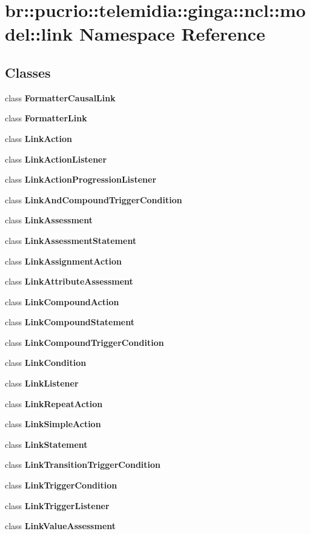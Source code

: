 \section{br::pucrio::telemidia::ginga::ncl::model::link Namespace Reference}
\label{namespacebr_1_1pucrio_1_1telemidia_1_1ginga_1_1ncl_1_1model_1_1link}


\subsection*{Classes}
\begin{CompactItemize}
\item 
class {\bf FormatterCausalLink}
\item 
class {\bf FormatterLink}
\item 
class {\bf LinkAction}
\item 
class {\bf LinkActionListener}
\item 
class {\bf LinkActionProgressionListener}
\item 
class {\bf LinkAndCompoundTriggerCondition}
\item 
class {\bf LinkAssessment}
\item 
class {\bf LinkAssessmentStatement}
\item 
class {\bf LinkAssignmentAction}
\item 
class {\bf LinkAttributeAssessment}
\item 
class {\bf LinkCompoundAction}
\item 
class {\bf LinkCompoundStatement}
\item 
class {\bf LinkCompoundTriggerCondition}
\item 
class {\bf LinkCondition}
\item 
class {\bf LinkListener}
\item 
class {\bf LinkRepeatAction}
\item 
class {\bf LinkSimpleAction}
\item 
class {\bf LinkStatement}
\item 
class {\bf LinkTransitionTriggerCondition}
\item 
class {\bf LinkTriggerCondition}
\item 
class {\bf LinkTriggerListener}
\item 
class {\bf LinkValueAssessment}
\end{CompactItemize}
